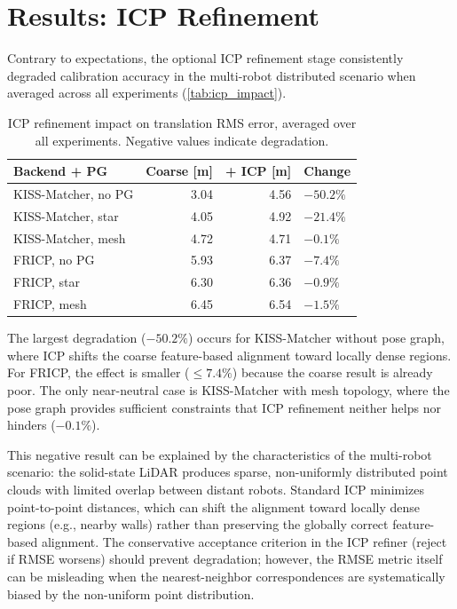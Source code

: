 \section{Results: ICP Refinement}
\label{sec:icp_impact}

Contrary to expectations, the optional ICP refinement stage
consistently degraded calibration accuracy in the multi-robot
distributed scenario when averaged across all experiments
(\autoref{tab:icp_impact}).

\begin{table}[htbp]
    \centering
    \caption{ICP refinement impact on translation RMS error,
             averaged over all experiments.
             Negative values indicate degradation.}
    \label{tab:icp_impact}
    \begin{tabular}{l r r l}
        \toprule
        \textbf{Backend + PG}
            & \textbf{Coarse} [m]
            & \textbf{+ ICP} [m]
            & \textbf{Change} \\
        \midrule
        KISS-Matcher, no PG   & 3.04  & 4.56  & $-50.2\%$ \\
        KISS-Matcher, star    & 4.05  & 4.92  & $-21.4\%$ \\
        KISS-Matcher, mesh    & 4.72  & 4.71  & $-0.1\%$  \\
        FRICP, no PG          & 5.93  & 6.37  & $-7.4\%$  \\
        FRICP, star           & 6.30  & 6.36  & $-0.9\%$  \\
        FRICP, mesh           & 6.45  & 6.54  & $-1.5\%$  \\
        \bottomrule
    \end{tabular}
\end{table}

The largest degradation ($-50.2\%$) occurs for KISS-Matcher without
pose graph, where ICP shifts the coarse feature-based alignment
toward locally dense regions.
For FRICP, the effect is smaller ($\leq 7.4\%$) because the coarse
result is already poor.
The only near-neutral case is KISS-Matcher with mesh topology,
where the pose graph provides sufficient constraints that ICP
refinement neither helps nor hinders ($-0.1\%$).

This negative result can be explained by the characteristics of the
multi-robot scenario:
the solid-state LiDAR produces sparse, non-uniformly distributed
point clouds with limited overlap between distant robots.
Standard ICP minimizes point-to-point distances, which can shift
the alignment toward locally dense regions (e.g., nearby walls)
rather than preserving the globally correct feature-based alignment.
The conservative acceptance criterion in the ICP refiner (reject if
RMSE worsens) should prevent degradation; however, the RMSE metric
itself can be misleading when the nearest-neighbor correspondences
are systematically biased by the non-uniform point distribution.


